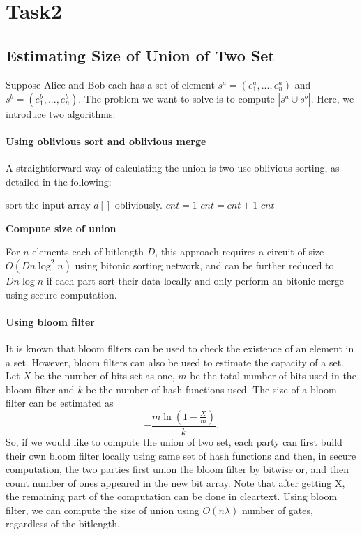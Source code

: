 \section{Task2}
\subsection{Estimating Size of Union of Two Set}
Suppose Alice and Bob each has a set of element $s^a = (e^a_1,...,e^a_n)$
and $s^b = (e^b_1,...,e^b_n)$. The problem we want to solve is 
to compute $|s^a\cup s^b|$. Here, we introduce two algorithms:

\paragraph{Using oblivious sort and oblivious merge}
A straightforward way of calculating the union is two use oblivious sorting, as detailed in the following:

\begin{algorithm}[t]
\begin{algorithmic}[1]
\State sort the input array $d[]$ obliviously.
\State $cnt = 1$
		\State $cnt = cnt + 1$
	\EndIf
\EndFor
\State\Return $cnt$
\end{algorithmic}
\caption{\textbf{Compute size of union}} %
\label{alg:osssp}
\end{algorithm}
For $n$ elements each of bitlength $D$, this approach requires a circuit of size $O(Dn\log^2n)$ using bitonic sorting network,
and can be further reduced to $Dn\log n$ if each part sort their data locally and only perform an bitonic merge using secure computation.

\paragraph{Using bloom filter}
It is known that bloom filters can be used to check the existence of an element in a set. However, bloom filters can also be used
to estimate the capacity of a set. Let $X$ be the number of bits set as one, $m$ be the total number of bits used in the bloom filter and
$k$ be the number of hash functions used. The size of a bloom filter can be estimated as 
$$-\frac{m\ln(1-\frac{X}{m})}{k}.$$
So, if we would like to compute the union of two set, each party can first build their own bloom filter locally using same set of hash functions
and then, in secure computation, the two parties first union the bloom filter by bitwise or, and then count number of ones appeared in the new bit array.
Note that after getting X, the remaining part of the computation can  be done in cleartext. Using bloom filter, we can compute the size of union using $O(n\lambda)$
number of gates, regardless of the bitlength.
